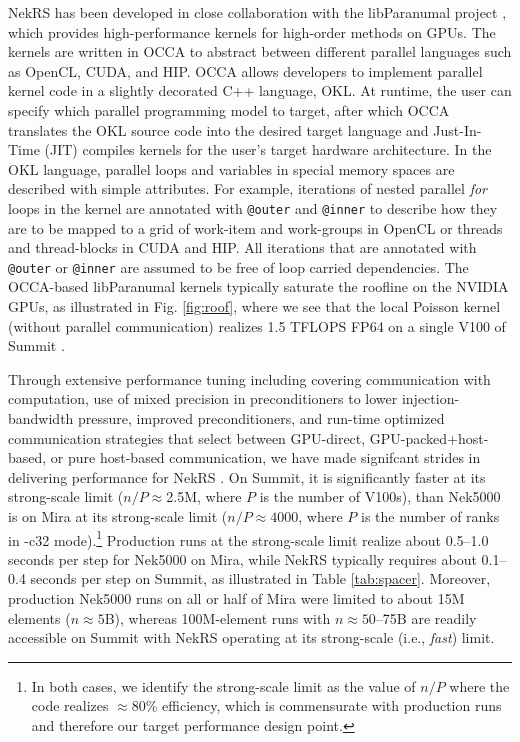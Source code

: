 NekRS has been developed in close collaboration with the libParanumal project
\cite{warburton2019,warburton2019b,ChalmersKarakusAustinSwirydowiczWarburton2020,streamParanumal2020},
which provides high-performance kernels for high-order methods on GPUs.  The
kernels are written in OCCA to abstract between different parallel languages
such as OpenCL, CUDA, and HIP. OCCA allows developers to implement parallel
kernel code in a slightly decorated C++ language, OKL.  At runtime, the user
can specify which parallel programming model to target, after which OCCA
translates the OKL source code into the desired target language and
Just-In-Time (JIT) compiles kernels for the user's target hardware
architecture.  In the OKL language, parallel loops and variables in special
memory spaces are described with simple attributes. For example, iterations of
nested parallel {\em for} loops in the kernel are annotated with
\texttt{@outer} and \texttt{@inner} to describe how they are to be mapped to a
grid of work-item and work-groups in OpenCL or threads and thread-blocks in
CUDA and HIP. All iterations that are annotated with \texttt{@outer} or
\texttt{@inner} are assumed to be free of loop carried dependencies. 
The OCCA-based libParanumal kernels
typically saturate the roofline on the NVIDIA GPUs, as illustrated
in Fig. \ref{fig:roof}, where we see that the local Poisson kernel
(without parallel communication) realizes 1.5 TFLOPS FP64 on a single V100
of Summit \cite{ceed_bp_paper_2020}.

Through extensive performance tuning including covering communication with
computation, use of mixed precision in preconditioners to lower
injection-bandwidth pressure, improved preconditioners, and run-time optimized
communication strategies that select between GPU-direct, GPU-packed+host-based,
or pure host-based communication, we have made signifcant strides in delivering
performance for NekRS \cite{nekrs}.  On Summit, it is significantly faster at
its strong-scale limit ($n/P \approx $2.5M, where $P$ is the number of V100s),
than Nek5000 is on Mira at its strong-scale limit ($n/P \approx 4000$, where $P$
is the number of ranks in -c32 mode).\footnote{In both cases, we identify the
strong-scale limit as the value of $n/P$ where the code realizes $\approx$80\%
efficiency, which is commensurate with production runs and therefore our
target performance design point.}  Production runs at the strong-scale
limit realize about 0.5--1.0 seconds per step for Nek5000 on Mira, while NekRS
typically requires about 0.1--0.4 seconds per step on Summit,  as illustrated
in Table \ref{tab:spacer}.  Moreover, production Nek5000 runs on all or half of
Mira were limited to about 15M elements ($n \approx 5$B), whereas 100M-element
runs with $n \approx 50$--75B are readily accessible on Summit with NekRS
operating at its strong-scale (i.e., {\em fast}) limit.



